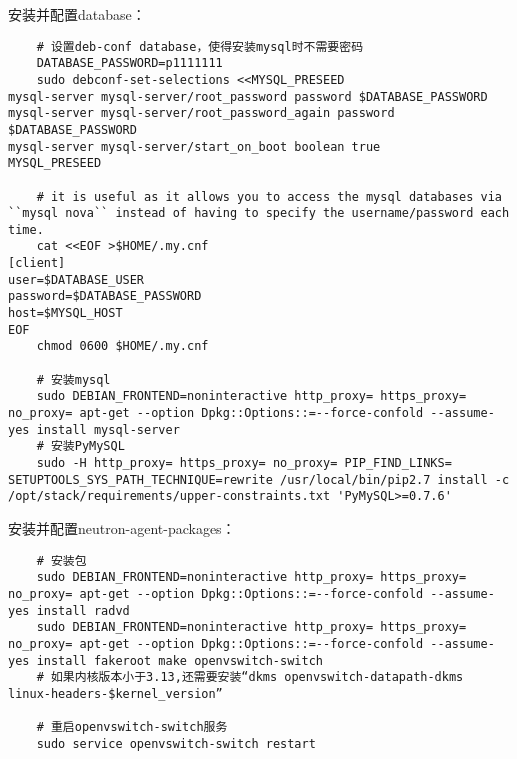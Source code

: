 \documentclass[a4paper,left=1.5cm,right=1.5cm,11pt]{article}
\begin{document}
	安装并配置database：
	\begin{lstlisting}
	# 设置deb-conf database，使得安装mysql时不需要密码
	DATABASE_PASSWORD=p1111111
	sudo debconf-set-selections <<MYSQL_PRESEED
mysql-server mysql-server/root_password password $DATABASE_PASSWORD
mysql-server mysql-server/root_password_again password $DATABASE_PASSWORD
mysql-server mysql-server/start_on_boot boolean true
MYSQL_PRESEED

	# it is useful as it allows you to access the mysql databases via ``mysql nova`` instead of having to specify the username/password each time.
	cat <<EOF >$HOME/.my.cnf
[client]
user=$DATABASE_USER
password=$DATABASE_PASSWORD
host=$MYSQL_HOST
EOF
	chmod 0600 $HOME/.my.cnf

	# 安装mysql
	sudo DEBIAN_FRONTEND=noninteractive http_proxy= https_proxy= no_proxy= apt-get --option Dpkg::Options::=--force-confold --assume-yes install mysql-server
	# 安装PyMySQL
	sudo -H http_proxy= https_proxy= no_proxy= PIP_FIND_LINKS= SETUPTOOLS_SYS_PATH_TECHNIQUE=rewrite /usr/local/bin/pip2.7 install -c /opt/stack/requirements/upper-constraints.txt 'PyMySQL>=0.7.6'
	\end{lstlisting}

	安装并配置neutron-agent-packages：
	\begin{lstlisting}
	# 安装包
	sudo DEBIAN_FRONTEND=noninteractive http_proxy= https_proxy= no_proxy= apt-get --option Dpkg::Options::=--force-confold --assume-yes install radvd
	sudo DEBIAN_FRONTEND=noninteractive http_proxy= https_proxy= no_proxy= apt-get --option Dpkg::Options::=--force-confold --assume-yes install fakeroot make openvswitch-switch
	# 如果内核版本小于3.13,还需要安装“dkms openvswitch-datapath-dkms linux-headers-$kernel_version”

	# 重启openvswitch-switch服务
	sudo service openvswitch-switch restart
	\end{lstlisting}
\end{document}

